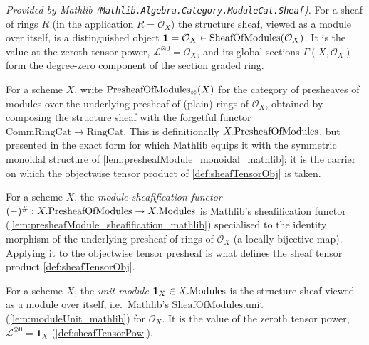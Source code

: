 \begin{lemma}
  \label{lem:moduleUnit_mathlib}
  \mathlibok
  \textit{Provided by Mathlib
  (\texttt{Mathlib.Algebra.Category.ModuleCat.Sheaf}).}
  For a sheaf of rings \(R\) (in the application \(R = \mathcal{O}_X\)) the
  structure sheaf, viewed as a module over itself, is a distinguished object
  \(\mathbf{1} = \mathcal{O}_X \in \mathrm{SheafOfModules}(\mathcal{O}_X)\). It is the value at
  the zeroth tensor power, \(\mathcal{L}^{\otimes 0} = \mathcal{O}_X\), and its
  global sections \(\Gamma(X, \mathcal{O}_X)\) form the degree-zero component of
  the section graded ring.
\end{lemma}

\begin{definition}
  \label{def:monoidalPresheaf}
  For a scheme \(X\), write \(\mathrm{PresheafOfModules}_{\otimes}(X)\) for the category of presheaves
  of modules over the underlying presheaf of (plain) rings of \(\mathcal{O}_X\),
  obtained by composing the structure sheaf with the forgetful functor
  \(\mathrm{CommRingCat} \to \mathrm{RingCat}\). This is definitionally
  \(X.\mathrm{PresheafOfModules}\), but presented in the exact form for which Mathlib equips it with
  the symmetric monoidal structure of \cref{lem:presheafModule_monoidal_mathlib};
  it is the carrier on which the objectwise tensor product of
  \cref{def:sheafTensorObj} is taken.
\end{definition}

\begin{definition}
  \label{def:schemeModuleSheafification}
  For a scheme \(X\), the \emph{module sheafification functor}
  \((-)^{\#} : X.\mathrm{PresheafOfModules} \to X.\mathrm{Modules}\) is Mathlib's sheafification functor
  (\cref{lem:presheafModule_sheafification_mathlib}) specialised to the identity
  morphism of the underlying presheaf of rings of \(\mathcal{O}_X\) (a locally
  bijective map). Applying it to the objectwise tensor presheaf is what defines the
  sheaf tensor product \cref{def:sheafTensorObj}.
\end{definition}

\begin{definition}
  \label{def:unitModule}
  For a scheme \(X\), the \emph{unit module} \(\mathbf{1}_X \in X.\mathrm{Modules}\) is the
  structure sheaf viewed as a module over itself, i.e.\ Mathlib's
  \(\mathrm{SheafOfModules.unit}\) (\cref{lem:moduleUnit_mathlib}) for
  \(\mathcal{O}_X\). It is the value of the zeroth tensor power,
  \(\mathcal{L}^{\otimes 0} = \mathbf{1}_X\) (\cref{def:sheafTensorPow}).
\end{definition}

